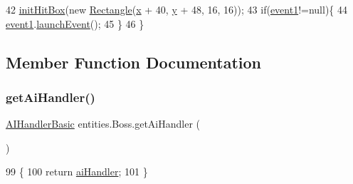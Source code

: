 \begin{DoxyCode}
42         \mbox{\hyperlink{classentities_1_1_mobile_entity_ae57193cf5e05bde18c9b1e2bf22a8eb8}{initHitBox}}(\textcolor{keyword}{new} \mbox{\hyperlink{classorg_1_1newdawn_1_1slick_1_1geom_1_1_rectangle_a27f83e29df8fa2df8988cd649ef87d47}{Rectangle}}(\mbox{\hyperlink{classorg_1_1newdawn_1_1slick_1_1geom_1_1_shape_a3e985bfff386c15a4efaad03d8ad60d3}{x}} + 40, \mbox{\hyperlink{classorg_1_1newdawn_1_1slick_1_1geom_1_1_shape_a9f934baded6a1b65ebb69e7e5f80ea00}{y}} + 48, 16, 16));
43         \textcolor{keywordflow}{if}(\mbox{\hyperlink{classentities_1_1_boss_a83ec98699f7d7252a29bbf6aa70c0201}{event1}}!=null)\{
44             \mbox{\hyperlink{classentities_1_1_boss_a83ec98699f7d7252a29bbf6aa70c0201}{event1}}.\mbox{\hyperlink{interfaceentities_1_1_event_launcher_a4aa8692d30404ff21b04dfc688e8efe0}{launchEvent}}();
45         \}
46     \}
\end{DoxyCode}


\subsection{Member Function Documentation}
\mbox{\label{classentities_1_1_boss_ae66fe60aa4e55353c4c32c945c6453b8}} 
\subsubsection{\texorpdfstring{get\+Ai\+Handler()}{getAiHandler()}}
{\footnotesize\ttfamily \mbox{\hyperlink{classentities_1_1_a_i_handler_basic}{A\+I\+Handler\+Basic}} entities.\+Boss.\+get\+Ai\+Handler (\begin{DoxyParamCaption}{ }\end{DoxyParamCaption})\hspace{0.3cm}{\ttfamily [inline]}}


\begin{DoxyCode}
99                                          \{
100         \textcolor{keywordflow}{return} \mbox{\hyperlink{classentities_1_1_boss_a5b11e193519ab0f145d6c1e672d63714}{aiHandler}};
101     \}
\end{DoxyCode}
\mbox{\label{classentities_1_1_boss_a73747c90d3363bbefa2589abddb164d3}} 
